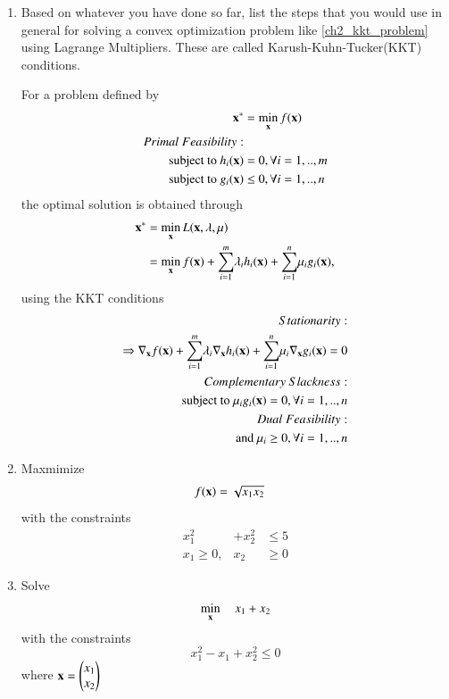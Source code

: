 \documentclass[journal,12pt,twocolumn]{IEEEtran}
\renewcommand\thesection{\arabic{section}}
\begin{document}
\begin{enumerate}[label=\thesection.\arabic*,ref=\thesection.\theenumi]
%
\item
Based on whatever you have done so far,	list the steps that you would use in general for solving a convex optimization problem  like \eqref{ch2_kkt_problem}  using Lagrange Multipliers. 
These are called Karush-Kuhn-Tucker(KKT) conditions.

\solution For a problem defined by 
\begin{align}
\mathbf{x^*} &= \min_{\mathbf{x}}f(\mathbf{x})
\\
Primal\text{ } Feasibility:
\nonumber\\
\text{subject to } h_i(\mathbf{x}) &= 0, \forall i=1,..,m
\\
\text{subject to } g_i(\mathbf{x}) &\le 0, \forall i=1,..,n
\end{align}
%
the optimal solution is obtained through
%
\begin{align}
\mathbf{x^*} &= \min_{\mathbf{x}}L(\mathbf{x}, \mathbf{\lambda}, \mathbf{\mu}) 
\\
&= \min_{\mathbf{x}}f(\mathbf{x})  + \underset{i=1}{\overset{m}{\sum}} \lambda_i h_i(\mathbf{x}) + \underset{i=1}{\overset{n}{\sum}} \mu_i g_i(\mathbf{x}),
\end{align}
%
using the KKT conditions
%
\begin{align}
Stationarity:
\nonumber\\
\Rightarrow \nabla_\mathbf{x} f(\mathbf{x})  + \underset{i=1}{\overset{m}{\sum}}  \lambda_i 
\nabla_\mathbf{x}h_i(\mathbf{x}) + \underset{i=1}{\overset{n}{\sum}} \mu_i \nabla_\mathbf{x} g_i(\mathbf{x}) = 0 
\\
Complementary \text{ } Slackness:
\nonumber\\
\text{subject to }\mu_i g_i(\mathbf{x}) = 0, \forall i = 1,..,n
\\
Dual\text{ } Feasibility:
\nonumber\\
\text{and }\mu_i \ge 0, \forall i = 1,..,n
\end{align}
%
\item
	Maxmimize 
	\begin{align}
	f(\mathbf{x}) &= \sqrt{x_1x_2}
	\end{align}
	with the constraints
	\begin{align}
	x_1^2&+x_2^2 &\leq 5 \\
	x_1 \geq 0,& x_2 &\geq 0
	\end{align}

%
\item
	\label{convex_sdp_eqiv}
	Solve
	\begin{equation}
	\min_{\mathbf{x}} \quad x_1 + x_2
	\end{equation}
	with the constraints
	\begin{equation}
	x_1^2 - x_1 + x_2^2 \leq 0
	\end{equation}
where 
$
\mathbf{x} = \begin{pmatrix}
x_1 \\
x_2
\end{pmatrix}
$


\end{enumerate}
\end{document}
